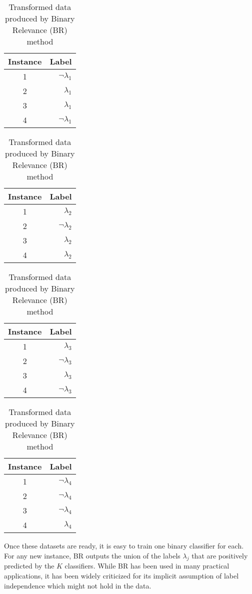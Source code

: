 \begin{table}[!htb]
\caption{Transformed data produced by Binary Relevance (BR) method}
\label{table:MLBR}
\centering
\begin{subtable}[]{.22\textwidth}
\centering
\begin{tabular}{c|r}
\toprule
Instance & Label \\
\hline
1 & $\lnot \lambda_1$\\
2 & $\lambda_1$ \\
3 & $\lambda_1$ \\
4 & $\lnot\lambda_1$ \\
\bottomrule
\end{tabular}
\subcaption{}
\end{subtable}
\hfill
\begin{subtable}[]{.22\textwidth}
\centering
\begin{tabular}{c|r}
\toprule
Instance & Label \\
\hline
1 & $ \lambda_2$\\
2 & $\lnot\lambda_2$ \\
3 & $\lambda_2$ \\
4 & $\lambda_2$ \\
\bottomrule
\end{tabular}
\subcaption{}
\end{subtable}
\hfill
\begin{subtable}[]{.22\textwidth}
\centering
\begin{tabular}{c|r}
\toprule
Instance & Label \\
\hline
1 & $\lambda_3$ \\
2 & $\lnot\lambda_3$\\
3 & $\lambda_3$ \\
4 & $\lnot\lambda_3$\\
\bottomrule
\end{tabular}
\subcaption{}
\end{subtable}
\hfill
\begin{subtable}[]{.22\textwidth}
\centering
\begin{tabular}{c|r}
\toprule
Instance & Label \\
\hline
1 & $\lnot\lambda_4$\\
2 & $\lnot\lambda_4$ \\
3 & $\lnot\lambda_4$ \\
4 & $\lambda_4$ \\
\bottomrule
\end{tabular}
\subcaption{}
\end{subtable}
\end{table}
Once these datasets are ready, it is easy to train one binary classifier for each. For any new instance, BR outputs the union of the labels $\lambda_j$ that are positively predicted by the $K$ classifiers. While BR has been used in many practical applications, it has been widely criticized for its implicit assumption of label independence which might not hold in the data.

